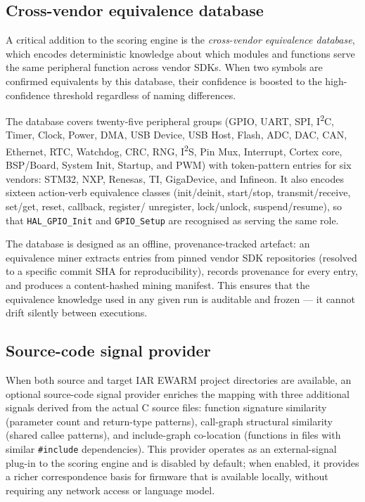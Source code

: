 \subsection{Cross-vendor equivalence database}
\label{sec:tool-equivalence}

A critical addition to the scoring engine is the \emph{cross-vendor equivalence database},
which encodes deterministic knowledge about which modules and functions serve the same
peripheral function across vendor SDKs. When two symbols are confirmed equivalents by this
database, their confidence is boosted to the high-confidence threshold regardless of naming
differences.

The database covers twenty-five peripheral groups (GPIO, UART, SPI, I\textsuperscript{2}C,
Timer, Clock, Power, DMA, USB Device, USB Host, Flash, ADC, DAC, CAN, Ethernet, RTC,
Watchdog, CRC, RNG, I\textsuperscript{2}S, Pin Mux, Interrupt, Cortex core, BSP/Board,
System Init, Startup, and PWM) with token-pattern entries for six vendors: STM32, NXP,
Renesas, TI, GigaDevice, and Infineon. It also encodes sixteen action-verb equivalence
classes (init/deinit, start/stop, transmit/receive, set/get, reset, callback, register/
unregister, lock/unlock, suspend/resume), so that \texttt{HAL\_GPIO\_Init} and
\texttt{GPIO\_Setup} are recognised as serving the same role.

The database is designed as an offline, provenance-tracked artefact: an equivalence miner
extracts entries from pinned vendor SDK repositories (resolved to a specific commit SHA for
reproducibility), records provenance for every entry, and produces a content-hashed mining
manifest. This ensures that the equivalence knowledge used in any given run is auditable
and frozen --- it cannot drift silently between executions.

\subsection{Source-code signal provider}
\label{sec:tool-source-code}

When both source and target IAR EWARM project directories are available, an optional
source-code signal provider enriches the mapping with three additional signals derived from
the actual C source files: function signature similarity (parameter count and return-type
patterns), call-graph structural similarity (shared callee patterns), and include-graph
co-location (functions in files with similar \texttt{\#include} dependencies). This
provider operates as an external-signal plug-in to the scoring engine and is disabled by
default; when enabled, it provides a richer correspondence basis for firmware that is
available locally, without requiring any network access or language model.

